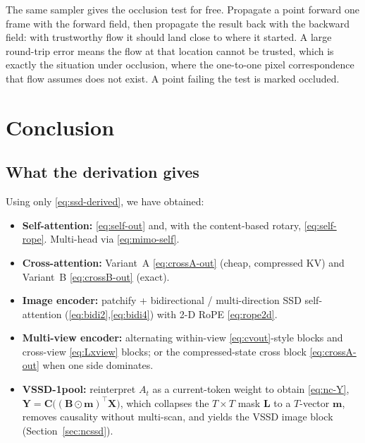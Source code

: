 \documentclass[11pt,a4paper]{article}
\begin{document}
The same sampler gives the occlusion test for free. Propagate a point forward one
frame with the forward field, then propagate the result back with the backward
field: with trustworthy flow it should land close to where it started. A large
round-trip error means the flow at that location cannot be trusted, which is
exactly the situation under occlusion, where the one-to-one pixel correspondence
that flow assumes does not exist. A point failing the test is marked occluded.

\section{Conclusion}

\subsection{What the derivation gives}

Using only \eqref{eq:ssd-derived}, we have obtained:

\begin{itemize}
  \item \textbf{Self-attention:} \eqref{eq:self-out} and, with the
        content-based rotary, \eqref{eq:self-rope}. Multi-head via
        \eqref{eq:mimo-self}.
  \item \textbf{Cross-attention:} Variant~A \eqref{eq:crossA-out}
        (cheap, compressed KV) and Variant~B \eqref{eq:crossB-out}
        (exact).
  \item \textbf{Image encoder:} patchify + bidirectional /
        multi-direction SSD self-attention
        (\eqref{eq:bidi2},\eqref{eq:bidi4}) with 2-D RoPE
        \eqref{eq:rope2d}.
  \item \textbf{Multi-view encoder:} alternating within-view
        \eqref{eq:cvout}-style blocks and cross-view
        \eqref{eq:Lxview} blocks; or the compressed-state cross
        block \eqref{eq:crossA-out} when one side dominates.
  \item \textbf{VSSD-1pool:} reinterpret $A_t$ as a
        current-token weight to obtain \eqref{eq:nc-Y},
        $\bm{Y} = \bm{C}\bigl((\bm{B}\odot\bm{m})^\top\bm{X}\bigr)$,
        which collapses the $T\times T$ mask $\bm{L}$ to a
        $T$-vector $\bm{m}$, removes causality without multi-scan,
        and yields the VSSD image block (Section~\ref{sec:ncssd}).
\end{itemize}
\end{document}
